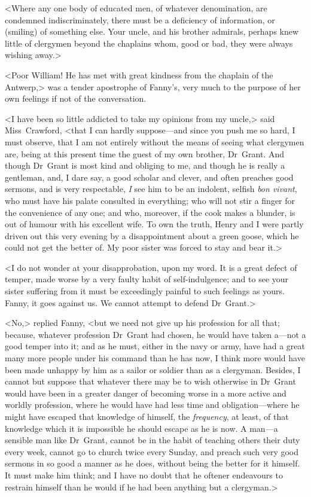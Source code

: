 <Where any one body of educated men, of whatever denomination, are condemned indiscriminately, there must be a deficiency of information, or (smiling) of something else. Your uncle, and his brother admirals, perhaps knew little of clergymen beyond the chaplains whom, good or bad, they were always wishing away.>

<Poor William! He has met with great kindness from the chaplain of the Antwerp,> was a tender apostrophe of Fanny's, very much to the purpose of her own feelings if not of the conversation.

<I have been so little addicted to take my opinions from my uncle,> said Miss~Crawford, <that I can hardly suppose—and since you push me so hard, I must observe, that I am not entirely without the means of seeing what clergymen are, being at this present time the guest of my own brother, Dr~Grant. And though Dr~Grant is most kind and obliging to me, and though he is really a gentleman, and, I dare say, a good scholar and clever, and often preaches good sermons, and is very respectable, \textit{I}  see him to be an indolent, selfish \textit{bon vivant}, who must have his palate consulted in everything; who will not stir a finger for the convenience of any one; and who, moreover, if the cook makes a blunder, is out of humour with his excellent wife. To own the truth, Henry and I were partly driven out this very evening by a disappointment about a green goose, which he could not get the better of. My poor sister was forced to stay and bear it.>

<I do not wonder at your disapprobation, upon my word. It is a great defect of temper, made worse by a very faulty habit of self-indulgence; and to see your sister suffering from it must be exceedingly painful to such feelings as yours. Fanny, it goes against us. We cannot attempt to defend Dr~Grant.>

<No,> replied Fanny, <but we need not give up his profession for all that; because, whatever profession Dr~Grant had chosen, he would have taken a—not a good temper into it; and as he must, either in the navy or army, have had a great many more people under his command than he has now, I think more would have been made unhappy by him as a sailor or soldier than as a clergyman. Besides, I cannot but suppose that whatever there may be to wish otherwise in Dr~Grant would have been in a greater danger of becoming worse in a more active and worldly profession, where he would have had less time and obligation—where he might have escaped that knowledge of himself, the \textit{frequency}, at least, of that knowledge which it is impossible he should escape as he is now. A man—a sensible man like Dr~Grant, cannot be in the habit of teaching others their duty every week, cannot go to church twice every Sunday, and preach such very good sermons in so good a manner as he does, without being the better for it himself. It must make him think; and I have no doubt that he oftener endeavours to restrain himself than he would if he had been anything but a clergyman.>

